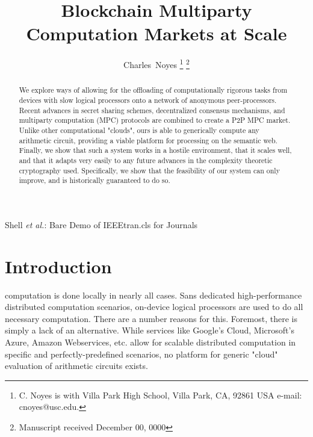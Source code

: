 \documentclass[journal,11pt]{IEEEtran}
\begin{document}
\title{Blockchain Multiparty Computation Markets at Scale}

\author{{Charles~Noyes}%
\thanks{C. Noyes is with Villa Park High School, Villa Park,
CA, 92861 USA e-mail: cnoyes@usc.edu.}%
\thanks{Manuscript received December 00, 0000}}

%
{Shell \MakeLowercase{\textit{et al.}}: Bare Demo of IEEEtran.cls for Journals}




\maketitle

\begin{abstract}
We explore ways of allowing for the offloading of computationally rigorous tasks from devices with slow logical processors onto a network of anonymous peer-processors. Recent advances in secret sharing schemes, decentralized consensus mechanisms, and multiparty computation (MPC) protocols are combined to create a P2P MPC market. Unlike other computational "clouds", ours is able to generically compute any arithmetic circuit, providing a viable platform for processing on the semantic web. Finally, we show that such a system works in a hostile environment, that it scales well, and that it adapts very easily to any future advances in the complexity theoretic cryptography used. Specifically, we show that the feasibility of our system can only improve, and is historically guaranteed to do so.
\end{abstract}


\IEEEpeerreviewmaketitle

\section{Introduction}
 computation is done locally in nearly all cases. Sans dedicated high-performance distributed computation scenarios, on-device logical processors are used to do all necessary computation. There are a number reasons for this. Foremost, there is simply a lack of an alternative. While services like Google's Cloud, Microsoft's Azure, Amazon Webservices, etc. allow for scalable distributed computation in specific and perfectly-predefined scenarios, no platform for generic "cloud" evaluation of arithmetic circuits exists.
\end{document}

